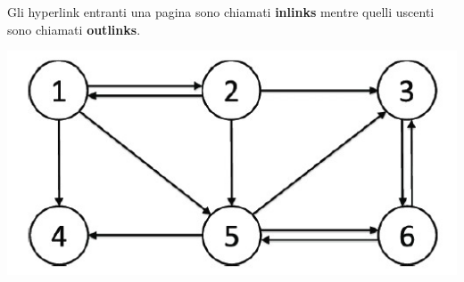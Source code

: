 Gli hyperlink entranti una pagina sono chiamati \textbf{inlinks} mentre quelli uscenti sono chiamati \textbf{outlinks}. 

\begin{center}
    \includegraphics[scale=0.4]{Images/TecnologieWeb/7/Graph.jpg}
\end{center}

